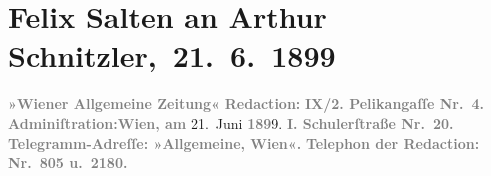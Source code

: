 

         
         \renewcommand{\erwaehntePersonen}{Personen: Paul Goldmann, Georg Hirschfeld, Hugo von Hofmannsthal, Felix Salten, Gustav Schwarzkopf, Julius Szeps}
         \renewcommand{\erwaehnteInstitutionen}{Institutionen: Burgtheater, Wiener Allgemeine Zeitung}
         \renewcommand{\erwaehnteOrte}{Orte: Berlin, Budapest, Pelikangasse, Schulerstraße, Slawonien, Wien}
         \renewcommand{\erwaehnteWerke}{Werke: ?? [Feuilleton über Paul Goldmann], Reigen. Zehn Dialoge, Scene aus der »Hochzeit der Sobeide«. (Ältere Niederschrift. Wien 1897. – Ungedruckt.), Wiener Allgemeine Montags-Zeitung, Wiener Allgemeine Rundschau}
               \section[ Felix Salten an Arthur Schnitzler, 21. 6. 1899]{ Felix Salten an Arthur Schnitzler, 21. 6. 1899}\nopagebreak{}\rehead{ }\begin{ledgroupsized}[t]{13cm}\normalsize\beginnumbering{} \toendnotes[C]{\smallbreak\pagebreak[2]} 
\toendnotes[C]{\smallbreak}\pstart
           \noindent{}{\pb}\textcolor{gray}{\textbf{\textbf{»Wiener Allgemeine
                        Zeitung«}}}\pend
           \pstart
           \textcolor{gray}{\textbf{Redaction:}}\pend
           \pstart
           \textcolor{gray}{\textbf{IX/2. \textbf{Pelikangaſſe
                        Nr.} 4. }}\pend
           \pstart
           \textcolor{gray}{\textbf{Adminiſtration:}}\hfill \textcolor{gray}{\textbf{Wien, am}}{ }21. Juni \textcolor{gray}{\textbf{189}}9.\pend
           \pstart
           \textcolor{gray}{\textbf{I. \textbf{Schulerſtraße
                        Nr.} 20. }}\pend
           \pstart
           \textcolor{gray}{\textbf{Telegramm-Adreſſe: »Allgemeine, Wien«.}}\pend
           \pstart
           \textcolor{gray}{\textbf{Telephon der Redaction: Nr. 805 u. 2180.}}\pend

\end{ledgroupsized}
